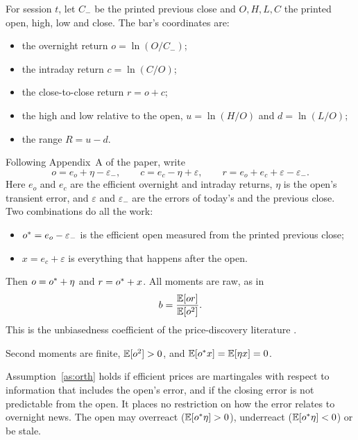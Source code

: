 For session $t$, let $C_{-}$ be the printed previous close and $O,H,L,C$ the printed open, high,
low and close. The bar's coordinates are:
\begin{itemize}
  \item the overnight return $o=\ln(O/C_{-})$;
  \item the intraday return $c=\ln(C/O)$;
  \item the close-to-close return $r=o+c$;
  \item the high and low relative to the open, $u=\ln(H/O)$ and $d=\ln(L/O)$;
  \item the range $R=u-d$.
\end{itemize}
Following Appendix~A of the paper, write
\begin{equation}\label{eq:model}
  o = e_o + \eta - \varepsilon_{-}, \qquad c = e_c - \eta + \varepsilon, \qquad r = e_o + e_c + \varepsilon - \varepsilon_{-}.
\end{equation}
Here $e_o$ and $e_c$ are the efficient overnight and intraday returns, $\eta$ is the open's
transient error, and $\varepsilon$ and $\varepsilon_{-}$ are the errors of today's and the
previous close. Two combinations do all the work:
\begin{itemize}
  \item ${o^{*}}=e_o-\varepsilon_{-}$ is the efficient open measured from the printed previous close;
  \item $x=e_c+\varepsilon$ is everything that happens after the open.
\end{itemize}
Then $o={o^{*}}+\eta$ and $r={o^{*}}+x$. All moments are raw, as in
\begin{equation}\label{eq:b}
  b=\frac{\mathbb{E}[or]}{\mathbb{E}[o^2]}.
\end{equation}
This is the unbiasedness coefficient of the price-discovery literature
\citep{BiaisHillionSpatt1999,BarclayHendershott2003}.

\begin{assumption}\label{as:orth}
Second moments are finite, $\mathbb{E}[o^2]>0$, and $\mathbb{E}[{o^{*}} x]=\mathbb{E}[\eta x]=0$.
\end{assumption}

Assumption~\ref{as:orth} holds if efficient prices are martingales with respect to information
that includes the open's error, and if the closing error is not predictable from the open. It
places no restriction on how the error relates to overnight news. The open may overreact
($\mathbb{E}[{o^{*}}\eta]>0$), underreact ($\mathbb{E}[{o^{*}}\eta]<0$) or be stale.

